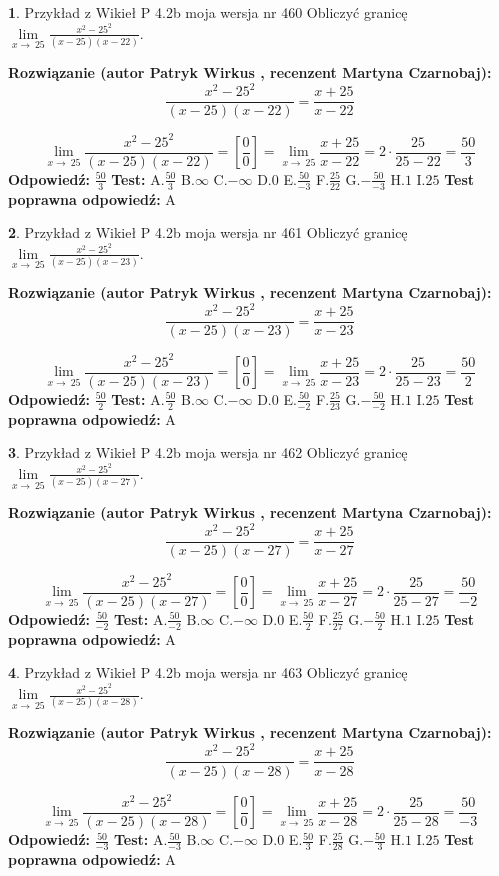 \documentclass[12pt, a4paper]{article}
\theoremstyle{definition} %
\newtheorem{zad}{}
\newcommand{\zadStart}[1]{\begin{zad}#1\newline}
\newcommand{\zadStop}{\end{zad}}
\newcommand{\rozwStart}[2]{\noindent \textbf{Rozwiązanie (autor #1 , recenzent #2): }\newline}
\newcommand{\rozwStop}{\newline}
\newcommand{\odpStart}{\noindent \textbf{Odpowiedź:}\newline}
\newcommand{\odpStop}{\newline}
\newcommand{\testStart}{\noindent \textbf{Test:}\newline}
\newcommand{\testStop}{\newline}
\newcommand{\kluczStart}{\noindent \textbf{Test poprawna odpowiedź:}\newline}
\newcommand{\kluczStop}{\newline}
\begin{document}
\zadStart{Przykład z Wikieł P 4.2b moja wersja nr 460}
Obliczyć granicę $\lim\limits_{x\to\ 25}\frac{x^{2}-25^{2}}{(x-25)(x-22)}$.
\zadStop
\rozwStart{Patryk Wirkus}{Martyna Czarnobaj}
$$\frac{x^{2}-25^{2}}{(x-25)(x-22)}=\frac{x+25}{x-22}$$

$$\lim\limits_{x\to\ 25}\frac{x^{2}-25^{2}}{(x-25)(x-22)}=[\frac{0}{0}]=\lim\limits_{x\to\ 25}\frac{x+25}{x-22}=2 \cdot \frac{25}{25-22} = \frac{50}{3}$$
\rozwStop
\odpStart
$\frac{50}{3}$
\odpStop
\testStart
A.$\frac{50}{3}$
B.$\infty$
C.$-\infty$
D.$0$
E.$\frac{50}{-3}$
F.$\frac{25}{22}$
G.$-\frac{50}{-3}$
H.$1$
I.$25$
\testStop
\kluczStart
A
\kluczStop



\zadStart{Przykład z Wikieł P 4.2b moja wersja nr 461}
Obliczyć granicę $\lim\limits_{x\to\ 25}\frac{x^{2}-25^{2}}{(x-25)(x-23)}$.
\zadStop
\rozwStart{Patryk Wirkus}{Martyna Czarnobaj}
$$\frac{x^{2}-25^{2}}{(x-25)(x-23)}=\frac{x+25}{x-23}$$

$$\lim\limits_{x\to\ 25}\frac{x^{2}-25^{2}}{(x-25)(x-23)}=[\frac{0}{0}]=\lim\limits_{x\to\ 25}\frac{x+25}{x-23}=2 \cdot \frac{25}{25-23} = \frac{50}{2}$$
\rozwStop
\odpStart
$\frac{50}{2}$
\odpStop
\testStart
A.$\frac{50}{2}$
B.$\infty$
C.$-\infty$
D.$0$
E.$\frac{50}{-2}$
F.$\frac{25}{23}$
G.$-\frac{50}{-2}$
H.$1$
I.$25$
\testStop
\kluczStart
A
\kluczStop



\zadStart{Przykład z Wikieł P 4.2b moja wersja nr 462}
Obliczyć granicę $\lim\limits_{x\to\ 25}\frac{x^{2}-25^{2}}{(x-25)(x-27)}$.
\zadStop
\rozwStart{Patryk Wirkus}{Martyna Czarnobaj}
$$\frac{x^{2}-25^{2}}{(x-25)(x-27)}=\frac{x+25}{x-27}$$

$$\lim\limits_{x\to\ 25}\frac{x^{2}-25^{2}}{(x-25)(x-27)}=[\frac{0}{0}]=\lim\limits_{x\to\ 25}\frac{x+25}{x-27}=2 \cdot \frac{25}{25-27} = \frac{50}{-2}$$
\rozwStop
\odpStart
$\frac{50}{-2}$
\odpStop
\testStart
A.$\frac{50}{-2}$
B.$\infty$
C.$-\infty$
D.$0$
E.$\frac{50}{2}$
F.$\frac{25}{27}$
G.$-\frac{50}{2}$
H.$1$
I.$25$
\testStop
\kluczStart
A
\kluczStop



\zadStart{Przykład z Wikieł P 4.2b moja wersja nr 463}
Obliczyć granicę $\lim\limits_{x\to\ 25}\frac{x^{2}-25^{2}}{(x-25)(x-28)}$.
\zadStop
\rozwStart{Patryk Wirkus}{Martyna Czarnobaj}
$$\frac{x^{2}-25^{2}}{(x-25)(x-28)}=\frac{x+25}{x-28}$$

$$\lim\limits_{x\to\ 25}\frac{x^{2}-25^{2}}{(x-25)(x-28)}=[\frac{0}{0}]=\lim\limits_{x\to\ 25}\frac{x+25}{x-28}=2 \cdot \frac{25}{25-28} = \frac{50}{-3}$$
\rozwStop
\odpStart
$\frac{50}{-3}$
\odpStop
\testStart
A.$\frac{50}{-3}$
B.$\infty$
C.$-\infty$
D.$0$
E.$\frac{50}{3}$
F.$\frac{25}{28}$
G.$-\frac{50}{3}$
H.$1$
I.$25$
\testStop
\kluczStart
A
\kluczStop
\end{document}
